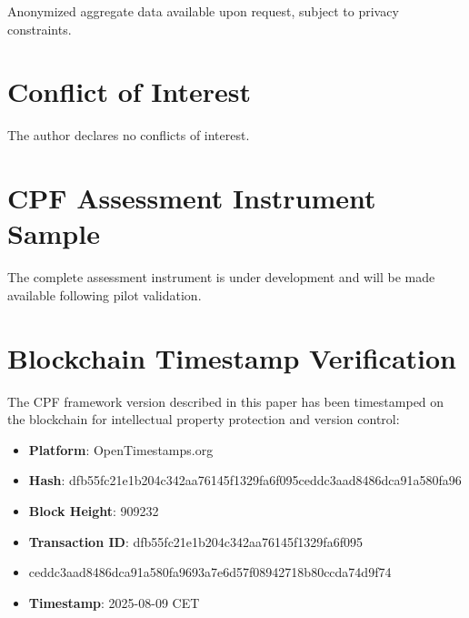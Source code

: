 \documentclass[11pt,a4paper]{article}
\begin{document}
Anonymized aggregate data available upon request, subject to privacy constraints.

\section*{Conflict of Interest}

The author declares no conflicts of interest.

\appendix

\section{CPF Assessment Instrument Sample}
\label{app:instrument}

The complete assessment instrument is under development and will be made available following pilot validation.

\section{Blockchain Timestamp Verification}
\label{app:blockchain}

The CPF framework version described in this paper has been timestamped on the blockchain for intellectual property protection and version control:

\begin{itemize}
\item \textbf{Platform}: OpenTimestamps.org
\item \textbf{Hash}: dfb55fc21e1b204c342aa76145f1329fa6f095ceddc3aad8486dca91a580fa96
\item \textbf{Block Height}: 909232
\item \textbf{Transaction ID}: dfb55fc21e1b204c342aa76145f1329fa6f095
\item ceddc3aad8486dca91a580fa9693a7e6d57f08942718b80ccda74d9f74
\item \textbf{Timestamp}: 2025-08-09 CET

\end{itemize}
\end{document}
